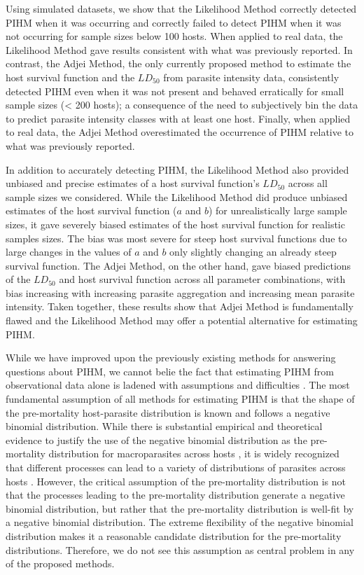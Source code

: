 \documentclass[12pt, a4paper]{article}
\begin{document}
Using simulated datasets, we show that the Likelihood Method correctly detected
PIHM when it was occurring and correctly failed to detect PIHM when it was not
occurring for sample sizes below 100 hosts. When applied to real data, the
Likelihood Method gave results consistent with what was previously reported. In
contrast, the Adjei Method, the only currently proposed method to estimate the
host survival function and the $LD_{50}$ from parasite intensity data, consistently
detected PIHM even when it was not present and behaved erratically for small sample sizes (< 200
hosts); a consequence of the need to
subjectively bin the data to predict parasite intensity classes with
at least one host.  Finally, when applied to real data, the Adjei Method overestimated the occurrence of PIHM relative to what was previously reported.

In addition to accurately detecting PIHM, the Likelihood Method also provided
unbiased and precise estimates of a host survival function's $LD_{50}$ across
all sample sizes we considered.  While the Likelihood Method did produce
unbiased estimates of the host survival function ($a$ and $b$) for
unrealistically large sample sizes, it gave severely biased estimates of the
host survival function for realistic samples sizes. The bias was most severe
for steep host survival functions due to large changes in the values of $a$ and
$b$ only slightly changing an already steep survival function. The Adjei
Method, on the other hand, gave biased predictions of the $LD_{50}$ and host
survival function across all parameter combinations, with bias increasing with
increasing parasite aggregation and increasing mean parasite intensity.  Taken
together, these results show that Adjei Method is fundamentally flawed and the
Likelihood Method may offer a potential alternative for estimating PIHM.

While we have improved upon the previously existing methods for answering
questions about PIHM, we cannot belie the fact that estimating PIHM from
observational data alone is ladened with assumptions and difficulties
\citep{McCallum2000a}. The most fundamental assumption of all methods for
estimating PIHM is that the shape of the pre-mortality host-parasite
distribution is known and follows a negative binomial distribution. While there
is substantial empirical and theoretical evidence to justify the use of the
negative binomial distribution as the pre-mortality distribution for
macroparasites across hosts \citep{Calabrese2011,Anderson1982a,Shaw1998}, it is
widely recognized that different processes can lead to a variety of
distributions of parasites across hosts
\citep{Isham1995,Grenfell1995b,Wilson2002, Duerr2003}.  However, the critical
assumption of the pre-mortality distribution is not that the processes leading
to the pre-mortality distribution generate a negative binomial distribution,
but rather that the pre-mortality distribution is well-fit by a negative
binomial distribution. The extreme flexibility of the negative binomial
distribution makes it a reasonable candidate distribution for the pre-mortality
distributions.  Therefore, we do not see this assumption as central problem in
any of the proposed methods.
\end{document}
